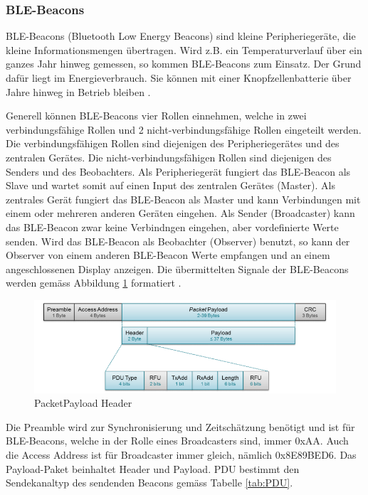 \subsubsection{BLE-Beacons}
BLE-Beacons (Bluetooth Low Energy Beacons) sind kleine Peripheriegeräte, die kleine Informationsmengen übertragen. Wird z.B. ein Temperaturverlauf über ein ganzes Jahr hinweg gemessen, so kommen BLE-Beacons zum Einsatz. Der Grund dafür liegt im Energieverbrauch. Sie können mit einer Knopfzellenbatterie über Jahre hinweg in Betrieb bleiben \cite{9_Teildokument_BT}.

Generell können BLE-Beacons vier Rollen einnehmen, welche in zwei verbindungsfähige Rollen und 2 nicht-verbindungsfähige Rollen eingeteilt werden. Die verbindungsfähigen Rollen sind diejenigen des Peripheriegerätes und des zentralen Gerätes. Die nicht-verbindungsfähigen Rollen sind diejenigen des Senders und des Beobachters. Als Peripheriegerät fungiert das BLE-Beacon als Slave und wartet somit auf einen Input des zentralen Gerätes (Master). Als zentrales Gerät fungiert das BLE-Beacon als Master und kann Verbindungen mit einem oder mehreren anderen Geräten eingehen. Als Sender (Broadcaster) kann das BLE-Beacon zwar keine Verbindngen eingehen, aber vordefinierte Werte senden. Wird das BLE-Beacon als Beobachter (Observer) benutzt, so kann der Observer von einem anderen BLE-Beacon Werte empfangen und an einem angeschlossenen Display anzeigen. Die übermittelten Signale der BLE-Beacons werden gemäss Abbildung \ref{fig:PacketPayload_Header} formatiert \cite{9_Teildokument_BT}.

\begin{figure}[htbp!!!!]
	\begin{center}
		\includegraphics[width=\textwidth]{data/PacketPayload_Header.png}
		\caption[PacketPayload Header \cite{9_Teildokument_BT}]{PacketPayload Header} %
		\label{fig:PacketPayload_Header}
	\end{center}
\end{figure}

Die Preamble wird zur Synchronisierung und Zeitschätzung benötigt und ist für BLE-Beacons, welche in der Rolle eines Broadcasters sind, immer 0xAA. Auch die Access Address ist für Broadcaster immer gleich, nämlich 0x8E89BED6. Das Payload-Paket beinhaltet Header und Payload. PDU bestimmt den Sendekanaltyp des sendenden Beacons gemäss Tabelle \ref{tab:PDU}.

